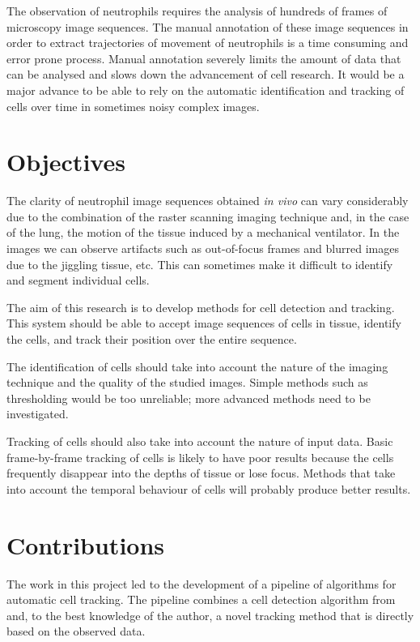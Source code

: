 		The observation of neutrophils requires the analysis of hundreds of frames of microscopy image sequences. The manual annotation of these image sequences in order to extract trajectories of movement of neutrophils is a time consuming and error prone process. Manual annotation severely limits the amount of data that can be analysed and slows down the advancement of cell research. It would be a major advance to be able to rely on the automatic identification and tracking of cells over time in sometimes noisy complex images.
		
	\section{Objectives}
		
		The clarity of neutrophil image sequences obtained \textit{in vivo} can vary considerably due to the combination of the raster scanning imaging technique and, in the case of the lung, the motion of the tissue induced by a mechanical ventilator. In the images we can observe artifacts such as out-of-focus frames and blurred images due to the jiggling tissue, etc. This can sometimes make it difficult to identify and segment individual cells.
		
		The aim of this research is to develop methods for cell detection and tracking. This system should be able to accept image sequences of cells in tissue, identify the cells, and track their position over the entire sequence.
		
		The identification of cells should take into account the nature of the imaging technique and the quality of the studied images. Simple methods such as thresholding would be too unreliable; more advanced methods need to be investigated.
		
		Tracking of cells should also take into account the nature of input data. Basic frame-by-frame tracking of cells is likely to have poor results because the cells frequently disappear into the depths of tissue or lose focus. Methods that take into account the temporal behaviour of cells will probably produce better results.
		
	\section{Contributions}
		
		The work in this project led to the development of a pipeline of algorithms for automatic cell tracking. The pipeline combines a cell detection algorithm from \cite{arteta12} and, to the best knowledge of the author, a novel tracking method that is directly based on the observed data. 
		
